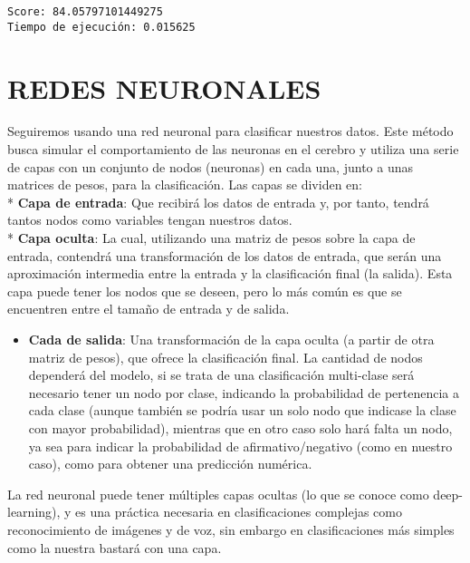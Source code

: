 \documentclass[11pt]{article}
\providecommand{\tightlist}{%
      \setlength{\itemsep}{0pt}\setlength{\parskip}{0pt}}
\begin{document}
    \begin{Verbatim}[commandchars=\\\{\}]
Score: 84.05797101449275
Tiempo de ejecución: 0.015625

    \end{Verbatim}

    \section{REDES NEURONALES}\label{redes-neuronales}

    Seguiremos usando una red neuronal para clasificar nuestros datos. Este
método busca simular el comportamiento de las neuronas en el cerebro y
utiliza una serie de capas con un conjunto de nodos (neuronas) en cada
una, junto a unas matrices de pesos, para la clasificación. Las capas se
dividen en:\\
* \textbf{Capa de entrada}: Que recibirá los datos de entrada y, por
tanto, tendrá tantos nodos como variables tengan nuestros datos.\\
* \textbf{Capa oculta}: La cual, utilizando una matriz de pesos sobre la
capa de entrada, contendrá una transformación de los datos de entrada,
que serán una aproximación intermedia entre la entrada y la
clasificación final (la salida). Esta capa puede tener los nodos que se
deseen, pero lo más común es que se encuentren entre el tamaño de
entrada y de salida.

\begin{itemize}
\tightlist
\item
  \textbf{Cada de salida}: Una transformación de la capa oculta (a
  partir de otra matriz de pesos), que ofrece la clasificación final. La
  cantidad de nodos dependerá del modelo, si se trata de una
  clasificación multi-clase será necesario tener un nodo por clase,
  indicando la probabilidad de pertenencia a cada clase (aunque también
  se podría usar un solo nodo que indicase la clase con mayor
  probabilidad), mientras que en otro caso solo hará falta un nodo, ya
  sea para indicar la probabilidad de afirmativo/negativo (como en
  nuestro caso), como para obtener una predicción numérica.
\end{itemize}

La red neuronal puede tener múltiples capas ocultas (lo que se conoce
como deep-learning), y es una práctica necesaria en clasificaciones
complejas como reconocimiento de imágenes y de voz, sin embargo en
clasificaciones más simples como la nuestra bastará con una capa.
\end{document}
